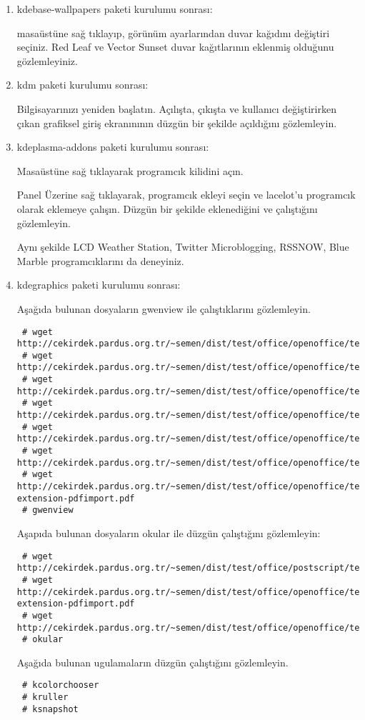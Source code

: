 \documentclass[a4paper,10pt]{article}
\begin{document}
\begin{enumerate}
\item kdebase-wallpapers paketi kurulumu sonrası:

masaüstüne sağ tıklayıp, görünüm ayarlarından duvar kağıdını değiştiri seçiniz. Red Leaf ve Vector Sunset duvar kağıtlarının eklenmiş olduğunu gözlemleyiniz.

\item kdm paketi kurulumu sonrası:

Bilgisayarınızı yeniden başlatın. Açılışta, çıkışta ve kullanıcı değiştirirken çıkan grafiksel giriş ekranınının düzgün bir şekilde açıldığını gözlemleyin.

\item kdeplasma-addons paketi kurulumu sonrası:

Masaüstüne sağ tıklayarak programcık kilidini açın.

Panel Üzerine sağ tıklayarak, programcık ekleyi seçin ve lacelot'u programcık olarak eklemeye çalışın. Düzgün bir şekilde eklenediğini ve çalıştığını gözlemleyin.

Aynı şekilde LCD Weather Station, Twitter Microblogging, RSSNOW, Blue Marble programcıklarını da deneyiniz.

\item kdegraphics paketi kurulumu sonrası:

Aşağıda bulunan dosyaların gwenview  ile çalıştıklarını gözlemleyin.  
\begin{verbatim} 
 # wget http://cekirdek.pardus.org.tr/~semen/dist/test/office/openoffice/test_oodraw.jpg
 # wget http://cekirdek.pardus.org.tr/~semen/dist/test/office/openoffice/test_oodraw.mng
 # wget http://cekirdek.pardus.org.tr/~semen/dist/test/office/openoffice/test_oodraw.png
 # wget http://cekirdek.pardus.org.tr/~semen/dist/test/office/openoffice/test_oodraw.ps
 # wget http://cekirdek.pardus.org.tr/~semen/dist/test/office/openoffice/test_oodraw.tif
 # wget http://cekirdek.pardus.org.tr/~semen/dist/test/office/openoffice/test_oodraw.xcf
 # wget http://cekirdek.pardus.org.tr/~semen/dist/test/office/openoffice/test_openoffice-extension-pdfimport.pdf
 # gwenview
\end{verbatim}
Aşapıda bulunan dosyaların okular ile düzgün çalıştığını gözlemleyin:
\begin{verbatim} 
 # wget http://cekirdek.pardus.org.tr/~semen/dist/test/office/postscript/test_ghostscript.dvi
 # wget http://cekirdek.pardus.org.tr/~semen/dist/test/office/openoffice/test_openoffice-extension-pdfimport.pdf
 # wget http://cekirdek.pardus.org.tr/~semen/dist/test/office/openoffice/test_oodraw.ps
 # okular
 \end{verbatim}

Aşağıda bulunan ugulamaların düzgün çalıştığını gözlemleyin.
\begin{verbatim}
 # kcolorchooser
 # kruller
 # ksnapshot
\end{verbatim}


\end{enumerate}
\end{document}
